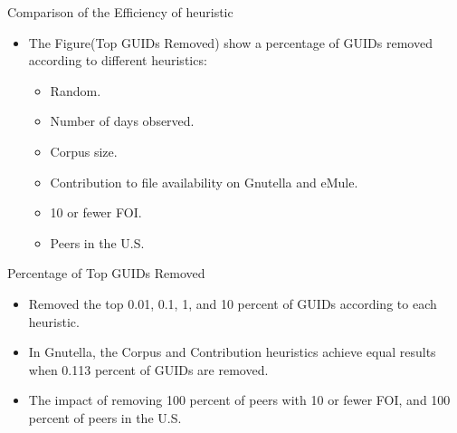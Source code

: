 \documentclass[notes]{beamer}
\begin{document}
\begin{frame}
\begin{block}{Comparison of the Efficiency of heuristic}
\begin{itemize}

\item[\checkmark] The Figure(Top GUIDs Removed) show a percentage of GUIDs removed according to different
heuristics:

\begin{itemize}

\item Random.
\item Number of days observed. 
\item Corpus size.
\item Contribution to file availability on Gnutella and eMule.
\item 10 or fewer FOI.
\item Peers in the U.S.

\end{itemize}
\end{itemize}
\end{block}
\end{frame}
\begin{frame}

\begin{block}{Percentage of Top GUIDs Removed}
\begin{itemize}

\item[\checkmark] Removed the top 0.01, 0.1, 1, and 10 percent of GUIDs according to each heuristic.
\item[\checkmark] In Gnutella, the Corpus and Contribution heuristics achieve equal results when 0.113 percent of GUIDs are removed. 
\item[\checkmark] The impact of removing 100 percent of peers with 10 or fewer
FOI, and 100 percent of peers in the U.S.

\end{itemize}
\end{block}
\end{frame}
\end{document}
